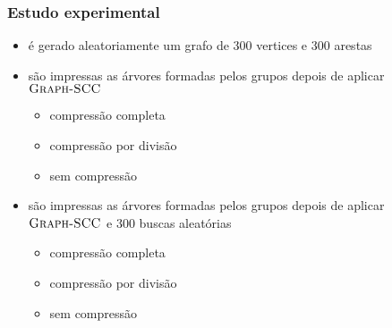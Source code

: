 \documentclass{beamer}
\begin{document}

\begin{frame}
\frametitle{Estudo experimental}

\begin{itemize}
\item é gerado aleatoriamente um grafo de 300 vertices e 300 arestas
\item são impressas as árvores formadas pelos grupos depois de aplicar
  $\textnormal{\scshape Graph-SCC}$
\begin{itemize}
\item compressão completa
\item compressão por divisão
\item sem compressão
\end{itemize}
\item são impressas as árvores formadas pelos grupos depois de aplicar
  $\textnormal{\scshape Graph-SCC}$ e 300 buscas aleatórias
\begin{itemize}
\item compressão completa
\item compressão por divisão
\item sem compressão
\end{itemize}

\end{itemize}

\end{frame}
\end{document}
